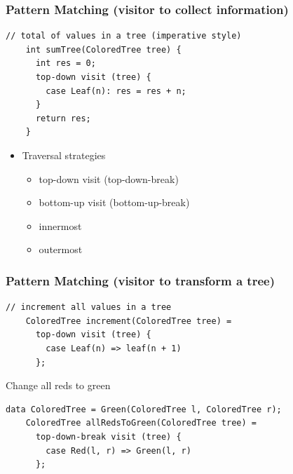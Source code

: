 \documentclass{beamer}
\begin{document}
\begin{frame}[fragile]
  \frametitle{Pattern Matching (visitor to collect information)}

    \begin{small}
      \begin{lstlisting}[language=Rascal]
    // total of values in a tree (imperative style)     
    int sumTree(ColoredTree tree) {
      int res = 0;
      top-down visit (tree) {
        case Leaf(n): res = res + n;
      }
      return res;
    }
\end{lstlisting}
\end{small}

  \begin{itemize}
    \item Traversal strategies
      \begin{itemize}
        \item top-down visit (top-down-break)
        \item bottom-up visit (bottom-up-break)
        \item innermost
        \item outermost  
      \end{itemize}  
  \end{itemize}  
\end{frame}

\begin{frame}[fragile]
  \frametitle{Pattern Matching (visitor to transform a tree)}

  \begin{lstlisting}[language=Rascal]
    // increment all values in a tree 
    ColoredTree increment(ColoredTree tree) =
      top-down visit (tree) {
        case Leaf(n) => leaf(n + 1)
      };
    \end{lstlisting}  
  \pause

  \begin{block}{Change all reds to green}
    \begin{lstlisting}[language=Rascal]
    data ColoredTree = Green(ColoredTree l, ColoredTree r);   
    ColoredTree allRedsToGreen(ColoredTree tree) =
      top-down-break visit (tree) {
        case Red(l, r) => Green(l, r)
      };
    \end{lstlisting}  
  \end{block}
\end{frame}

\begin{frame}
\end{frame}
\end{document}
